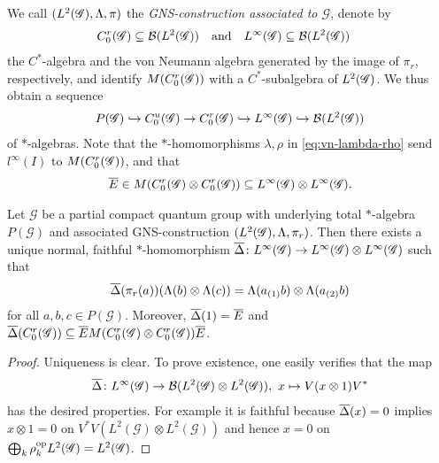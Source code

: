 We call $(L^{2}(\mathscr{G}),\Lambda,\pi)$ the \emph{GNS-construction associated
  to $\mathscr{G}$}, denote by
\begin{align}
  C^{r}_{0}(\mathscr{G}) &\subseteq {\cal B}(L^{2}(\mathscr{G})) &&\text{and} & L^{\infty}(\mathscr{G}) &\subseteq {\cal B}(L^{2}(\mathscr{G}))
\end{align}
the $C^{*}$-algebra and the von Neumann algebra generated by the image
of $\pi_{r}$, respectively, and identify $M(C^{r}_{0}(\mathscr{G}))$ with a
$C^{*}$-subalgebra of $L^{2}(\mathscr{G})$.  We thus obtain a sequence
\begin{align*}
P(\mathscr{G}) \hookrightarrow C^{u}_{0}(\mathscr{G}) \to
  C^{r}_{0}(\mathscr{G})\hookrightarrow
L^{\infty}(\mathscr{G}) \hookrightarrow {\cal B}(L^{2}(\mathscr{G}))
\end{align*}
of $*$-algebras.
Note that
 the $*$-homomorphisms $\lambda,\rho$ in
\eqref{eq:vn-lambda-rho} send $l^{\infty}(I)$ to $M(C^{r}_{0}(\mathscr{G}))$, and that
\begin{align*}
  \overline{E} \in M(C^{r}_{0}(\mathscr{G}) \otimes C^{r}_{0}(\mathscr{G})) \subseteq L^{\infty}(\mathscr{G}) \otimes L^{\infty}(\mathscr{G}).
\end{align*}
\begin{Prop} \label{prop:vn-delta} Let $\mathscr{G}$ be a partial
  compact quantum group with underlying total $*$-algebra
  $P(\mathscr{G})$ and associated GNS-construction
  $(L^{2}(\mathscr{G}),\Lambda,\pi_{r})$. Then there
  exists a unique normal, faithful $*$-homomorphism $\overline{\Delta} \colon
  L^{\infty}(\mathscr{G}) \to L^{\infty}(\mathscr{G}) \otimes L^{\infty}(\mathscr{G})$ such that
  \begin{align*}
    \overline{\Delta}(\pi_{r}(a)) (\Lambda(b) \otimes \Lambda(c)) =
    \Lambda(a_{(1)}b) \otimes \Lambda(a_{(2)}b) 
  \end{align*}
  for all $a,b,c \in P(\mathscr{G})$. Moreover, $\overline{\Delta}(1)=\overline{E}$ and
  $\overline{\Delta}(C^{r}_{0}(\mathscr{G})) \subseteq \overline{E} M(C^{r}_{0}(\mathscr{G}) \otimes
  C^{r}_{0}(\mathscr{G}))\overline{E}$.
\end{Prop}
\begin{proof}
  Uniqueness is clear. To prove existence, one easily verifies that
  the map
  \begin{align*}
 \overline{\Delta} \colon L^{\infty}(\mathscr{G}) \to {\cal B}(L^{2}(\mathscr{G}) \otimes L^{2}(\mathscr{G})), \ x
  \mapsto V(x \otimes 1)V^{*}   
  \end{align*}
  has the desired properties. For example it is faithful because
  $\overline{\Delta}(x)=0$ implies $x\otimes 1=0$ on $V^{*}V(L^{2}(\mathscr{G})
  \otimes L^{2}(\mathscr{G}))$ and hence $x=0$ on $\bigoplus_{k}
  \rho_{k}^{\operatorname{\mathrm{op}}}L^{2}(\mathscr{G})=L^{2}(\mathscr{G})$.
\end{proof}

